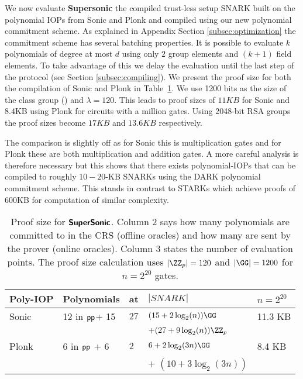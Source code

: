 We now evaluate \textsf{\textbf{Supersonic}} the compiled trust-less setup SNARK built on the polynomial IOPs from Sonic\cite{Sonic} and Plonk\cite{Plonk} and compiled using our new polynomial commitment scheme.
As explained in
\ifappendix
Appendix
\else
Section
\fi \ref{subsec:optimization} the commitment scheme has several batching properties. It is possible to evaluate $k$ polynomials of degree at most $d$ using only $2$ group elements and $(k+1)$ field elements. To take advantage of this we delay the evaluation until the last step of the protocol (see Section \ref{subsec:compiling}). We present the proof size for both the compilation of Sonic and Plonk in Table~\ref{tab:proofsize}. We use 1200 bits as the size of the class group (\cite{PKC/BucHam01}) and $\lambda=120$. This leads to proof sizes of $11KB$ for Sonic and $8.4$KB using Plonk for circuits with a million gates. Using 2048-bit RSA groups the proof sizes become $17KB$ and $13.6KB$ respectively. 

The comparison is slightly off as for Sonic this is multiplication gates and for Plonk these are both multiplication and addition gates. A more careful analysis is therefore necessary but this shows that there exists polynomial-IOPs that can be compiled to roughly $10-20$-KB SNARKs using the DARK polynomial commitment scheme. This stands in contrast to STARKs which achieve proofs of $600$KB for computation of similar complexity\cite{C:BBHR19}. 

\begin{table}

\begin{mdframed}


\begin{tabular}{l|l|l|l|l}
Poly-IOP &Polynomials  & \eval{} at& $|SNARK|$&$n=2^{20}$ \\
\hline

 Sonic\cite{Sonic}& 12 in $\textsf{pp}$+ 15 & $27$  & $(15+2\log_2(n))\GG$ &11.3 KB \\
 & & & $+(27+9\log_2(n))\ZZ_p$ &  \\
  Plonk\cite{Plonk}& $6$ in $\textsf{pp}$ + 6 & $2$& $6+2\log_2(3n)\GG$& 8.4 KB\\
  & & & + $(10+3\log_2(3n))$
	\end{tabular}
\end{mdframed}
\caption{Proof size for $\textsf{\textbf{SuperSonic}}$. Column 2 says how many polynomials are committed to in the CRS (offline oracles) and how many are sent by the prover (online oracles). Column 3 states the number of evaluation points. The proof size calculation uses $|\ZZ_p|=120$ and $|\GG|=1200$ for $n=2^{20}$ gates.}
\label{tab:proofsize}
\end{table}
